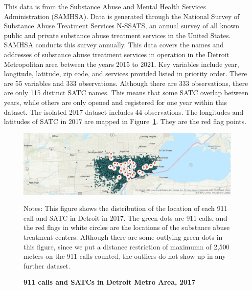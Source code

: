 \documentclass[12pt]{article}
\begin{document}
This data is from the Substance Abuse and Mental Health Services Administration (SAMHSA). Data is generated through the National Survey of Substance Abuse Treatment Services \href{https://www.samhsa.gov/data/data-we-collect/n-ssats-national-survey-substance-abuse-treatment-services}{N-SSATS}, an annual survey of all known public and private substance abuse treatment services in the United States. SAMHSA conducts this survey annually.  This data covers the names and addresses of substance abuse treatment services in operation in the Detroit Metropolitan area between the years 2015 to 2021. Key variables include year, longitude, latitude, zip code, and services provided listed in priority order. There are 55 variables and 333 observations.\footnotemark[2] Although there are 333 observations, there are only 115 distinct SATC names. This means that some SATC overlap between years, while others are only opened and registered for one year within this dataset. The isolated 2017 dataset includes 44 observations. The longitudes and latitudes of SATC in 2017 are mapped in Figure~\ref{fig:Figure2}. They are the red flag points. 

\begin{figure}[h!]
    \centering
\includegraphics[width=0.75\linewidth]{Reproducibility Package/Visual Graphics/ArcGIS_Map.jpg}
    \caption{\textbf{911 calls and SATCs in Detroit Metro Area, 2017}}
    \label{fig:Figure2}
     \centering\small{Notes: This figure shows the distribution of the location of each 911 call and SATC in Detroit in 2017. The green dots are 911 calls, and the red flags in white circles are the locations of the substance abuse treatment centers. Although there are some outlying green dots in this figure, since we put a distance restriction of maximumn of 2,500 meters on the 911 calls counted, the outliers do not show up in any further dataset.}
    
\end{figure}
\end{document}
